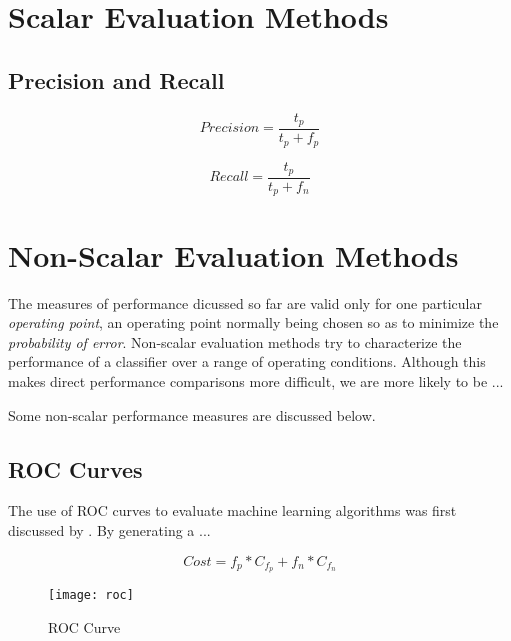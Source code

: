 \documentclass[10pt]{unbthesis}
\begin{document}
\section*{Scalar Evaluation Methods}


\subsection*{Precision and Recall}

\begin{equation}
\label{equ:precision}
Precision = \frac{t_p}{t_p + f_p}
\end{equation}


\begin{equation}
\label{equ:recall}
Recall = \frac{t_p}{t_p + f_n}
\end{equation}

\section*{Non-Scalar Evaluation Methods}
The measures of performance dicussed so far are valid only for one
particular \textit{operating point}, an operating point normally being
chosen so as to minimize the \textit{probability of error}. Non-scalar
evaluation methods try to characterize the performance of a classifier
over a range of operating conditions. Although this makes direct
performance comparisons more difficult, we are more likely to be ...

Some non-scalar performance measures are discussed below.

\subsection*{ROC Curves}
The use of ROC curves to evaluate machine learning algorithms was
first discussed by \cite{RefWorks:32}. By generating a ...

 

\begin{equation}
\label{equ:misclasscost}
Cost = f_p * C_f_p + f_n * C_f_n
\end{equation}




\begin{figure}
  \begin{center}
	\texttt{[image: roc]}
  \end{center}
  \caption{ROC Curve}
  \label{fig:roc}
\end{figure} 
\end{document}
